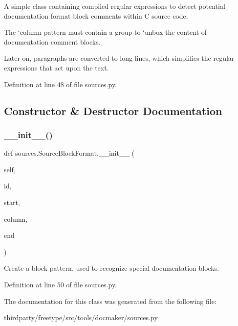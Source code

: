 A simple class containing compiled regular expressions to detect potential documentation format block comments within C source code.

The `column\textquotesingle{} pattern must contain a group to `unbox\textquotesingle{} the content of documentation comment blocks.

Later on, paragraphs are converted to long lines, which simplifies the regular expressions that act upon the text. 

Definition at line 48 of file sources.\+py.



\subsection{Constructor \& Destructor Documentation}
\mbox{\label{classsources_1_1_source_block_format_a764ff2b86029ec36449dcd7c4f3dca31}} 
\subsubsection{\texorpdfstring{\+\_\+\+\_\+init\+\_\+\+\_\+()}{\_\_init\_\_()}}
{\footnotesize\ttfamily def sources.\+Source\+Block\+Format.\+\_\+\+\_\+init\+\_\+\+\_\+ (\begin{DoxyParamCaption}\item[{}]{self,  }\item[{}]{id,  }\item[{}]{start,  }\item[{}]{column,  }\item[{}]{end }\end{DoxyParamCaption})}

\begin{DoxyVerb}Create a block pattern, used to recognize special documentation
   blocks.\end{DoxyVerb}
 

Definition at line 50 of file sources.\+py.



The documentation for this class was generated from the following file\+:\begin{DoxyCompactItemize}
\item 
thirdparty/freetype/src/tools/docmaker/sources.\+py\end{DoxyCompactItemize}
